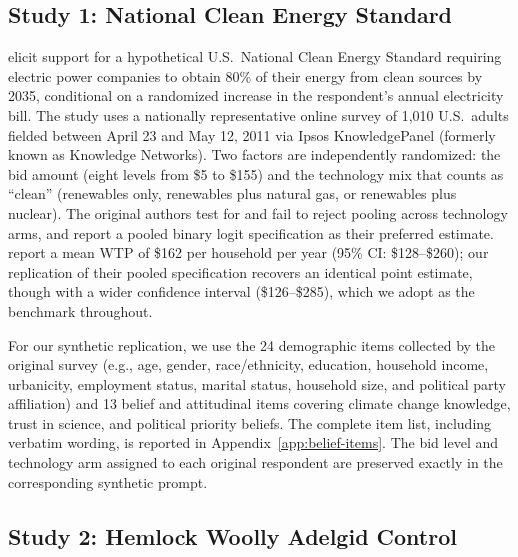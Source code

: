 \documentclass[12pt]{article}
\begin{document}
\subsection{Study 1: National Clean Energy Standard}\label{sec:data-nces}

\textcite{Aldy2012} elicit support for a hypothetical U.S.\ National Clean
Energy Standard requiring electric power companies to obtain 80\% of their
energy from clean sources by 2035, conditional on a randomized increase in
the respondent's annual electricity bill. The study uses a nationally
representative online survey of 1{,}010 U.S.\ adults fielded between
April 23 and May 12, 2011 via Ipsos KnowledgePanel (formerly known as Knowledge Networks). Two
factors are independently randomized: the bid amount (eight levels from
\$5 to \$155) and the technology mix that counts as ``clean'' (renewables
only, renewables plus natural gas, or renewables plus nuclear). The
original authors test for and fail to reject pooling across technology
arms, and report a pooled binary logit specification as their preferred
estimate. \textcite{Aldy2012} report a mean WTP of \$162 per household per year (95\% CI:
\$128--\$260); our replication of their pooled specification recovers an identical point estimate, though with a wider confidence interval (\$126--\$285), which we adopt as the
benchmark throughout.

For our synthetic replication, we use the 24 demographic items
collected by the original survey (e.g., age, gender, race/ethnicity, education,
household income, urbanicity, employment status, marital status, household size,
and political party affiliation) and 13 belief and attitudinal items
covering climate
change knowledge, trust in science, and political priority beliefs. The complete item list, including verbatim wording, is
reported in Appendix~\ref{app:belief-items}. The bid level and technology
arm assigned to each original respondent are preserved exactly in the
corresponding synthetic prompt.

\subsection{Study 2: Hemlock Woolly Adelgid Control}\label{sec:data-hwa}
\end{document}
